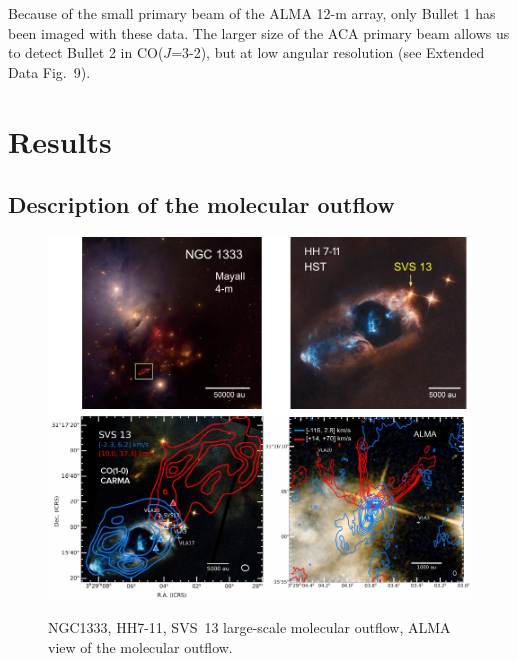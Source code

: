 \documentclass[12pt]{mythesis}
\begin{document}
Because of the small primary beam of the ALMA 12-m array, only Bullet 1 has been imaged with these data. The larger size of the ACA primary beam allows us to detect Bullet 2 in CO($J$=3-2), but at low angular resolution (see Extended Data Fig.~9).



\section{Results}

\subsection{Description of the molecular outflow}

\begin{figure}[h!]
\begin{center}
\includegraphics[width=1.0\textwidth]{figures/SVS13outflow.pdf}\\
\caption[SVS~13 outflow]{
	NGC1333, HH7-11, SVS~13 large-scale molecular outflow, ALMA view of the molecular outflow.
\label{fig:SVS13outflow}}
\end{center}
 \end{figure}
\end{document}
